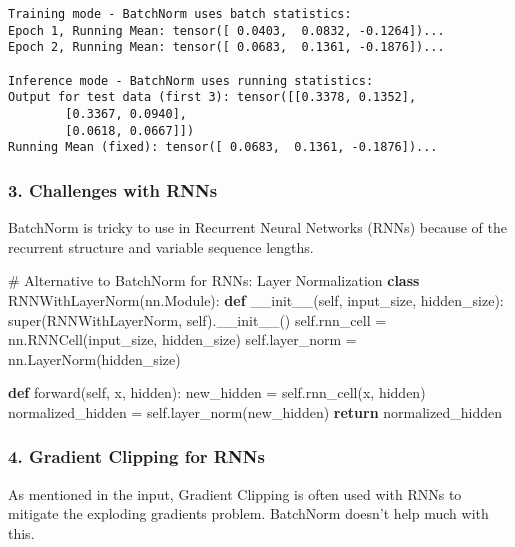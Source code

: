 \documentclass[
  letterpaper,
  DIV=11,
  numbers=noendperiod]{scrreprt}
\newenvironment{Shaded}{\begin{snugshade}}{\end{snugshade}}
\newcommand{\BuiltInTok}[1]{\textcolor[rgb]{0.00,0.23,0.31}{#1}}
\newcommand{\CommentTok}[1]{\textcolor[rgb]{0.37,0.37,0.37}{#1}}
\newcommand{\ControlFlowTok}[1]{\textcolor[rgb]{0.00,0.23,0.31}{\textbf{#1}}}
\newcommand{\FunctionTok}[1]{\textcolor[rgb]{0.28,0.35,0.67}{#1}}
\newcommand{\KeywordTok}[1]{\textcolor[rgb]{0.00,0.23,0.31}{\textbf{#1}}}
\newcommand{\NormalTok}[1]{\textcolor[rgb]{0.00,0.23,0.31}{#1}}
\newcommand{\OperatorTok}[1]{\textcolor[rgb]{0.37,0.37,0.37}{#1}}
\newcommand{\VariableTok}[1]{\textcolor[rgb]{0.07,0.07,0.07}{#1}}
\begin{document}
\begin{verbatim}
Training mode - BatchNorm uses batch statistics:
Epoch 1, Running Mean: tensor([ 0.0403,  0.0832, -0.1264])...
Epoch 2, Running Mean: tensor([ 0.0683,  0.1361, -0.1876])...

Inference mode - BatchNorm uses running statistics:
Output for test data (first 3): tensor([[0.3378, 0.1352],
        [0.3367, 0.0940],
        [0.0618, 0.0667]])
Running Mean (fixed): tensor([ 0.0683,  0.1361, -0.1876])...
\end{verbatim}

\subsubsection{3. Challenges with RNNs}\label{challenges-with-rnns}

BatchNorm is tricky to use in Recurrent Neural Networks (RNNs) because
of the recurrent structure and variable sequence lengths.

\begin{Shaded}
\begin{Highlighting}[]
\CommentTok{\# Alternative to BatchNorm for RNNs: Layer Normalization}
\KeywordTok{class}\NormalTok{ RNNWithLayerNorm(nn.Module):}
    \KeywordTok{def} \FunctionTok{\_\_init\_\_}\NormalTok{(}\VariableTok{self}\NormalTok{, input\_size, hidden\_size):}
        \BuiltInTok{super}\NormalTok{(RNNWithLayerNorm, }\VariableTok{self}\NormalTok{).}\FunctionTok{\_\_init\_\_}\NormalTok{()}
        \VariableTok{self}\NormalTok{.rnn\_cell }\OperatorTok{=}\NormalTok{ nn.RNNCell(input\_size, hidden\_size)}
        \VariableTok{self}\NormalTok{.layer\_norm }\OperatorTok{=}\NormalTok{ nn.LayerNorm(hidden\_size)}
        
    \KeywordTok{def}\NormalTok{ forward(}\VariableTok{self}\NormalTok{, x, hidden):}
\NormalTok{        new\_hidden }\OperatorTok{=} \VariableTok{self}\NormalTok{.rnn\_cell(x, hidden)}
\NormalTok{        normalized\_hidden }\OperatorTok{=} \VariableTok{self}\NormalTok{.layer\_norm(new\_hidden)}
        \ControlFlowTok{return}\NormalTok{ normalized\_hidden}
\end{Highlighting}
\end{Shaded}

\subsubsection{4. Gradient Clipping for
RNNs}\label{gradient-clipping-for-rnns}

As mentioned in the input, Gradient Clipping is often used with RNNs to
mitigate the exploding gradients problem. BatchNorm doesn't help much
with this.
\end{document}
